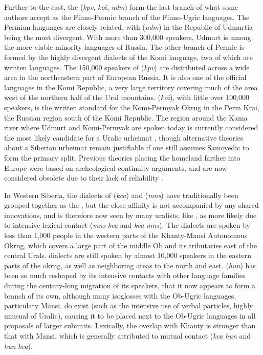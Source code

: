 Further to the east, the  (\textit{kpv}, \textit{koi}, \textit{udm}) form the last branch of what some authors accept as the Finno-Permic branch of the Finno-Ugric languages. The Permian languages are closely related, with  (\textit{udm}) in the Republic of Udmurtia being the most divergent. With more than 300,000 speakers, Udmurt is among the more viable minority languages of Russia. The other branch of Permic is formed by the highly divergent dialects of the Komi language, two of which are written languages. The 150,000 speakers of  (\textit{kpv}) are distributed across a wide area in the northeastern part of European Russia. It is also one of the official languages in the Komi Republic, a very large territory covering much of the area west of the northern half of the Ural mountains.  (\textit{koi}), with little over 100,000 speakers, is the written standard for the Komi-Permyak Okrug in the Perm Krai, the Russian region south of the Komi Republic. The region around the Kama river where Udmurt and Komi-Permyak are spoken today is currently considered the most likely candidate for a Uralic urheimat \citep{hakkinen2009}, though alternative theories about a Siberian urheimat remain justifiable if one still assumes Samoyedic to form the primary split. Previous theories placing the homeland farther into Europe were based on archeological continuity arguments, and are now considered obsolete due to their lack of reliability \citep{hakkinen2006}.

In Western Siberia, the dialects of  (\textit{kca}) and  (\textit{mns}) have traditionally been grouped together as the , but the close affinity is not accompanied by any shared innovations, and is therefore now seen by many uralists, like \cite{salminen2002}, as more likely due to intensive lexical contact (\textit{mns} \arrowOA \textit{kca} and \textit{kca} \arrowOA \textit{mns}). The  dialects are spoken by less than 1,000 people in the western parts of the Khanty-Mansi Autonomous Okrug, which covers a large part of the middle Ob and its tributaries east of the central Urals.  dialects are still spoken by almost 10,000 speakers in the eastern parts of the okrug, as well as neighboring areas to the north and east.  (\textit{hun}) has been so much reshaped by its intensive contacts with other language families during the century-long migration of its speakers, that it now appears to form a branch of its own, although many
isoglosses with the Ob-Ugric languages, particulary Mansi, do exist (such as the intensive use of verbal particles, highly unusual of Uralic), causing it to be placed next to the Ob-Ugric languages in all proposals of larger subunits. Lexically, the overlap with Khanty is stronger than that with Mansi, which is generally attributed to mutual contact (\textit{kca} \arrowOA \textit{hun} and \textit{hun} \arrowOA \textit{kca}).

